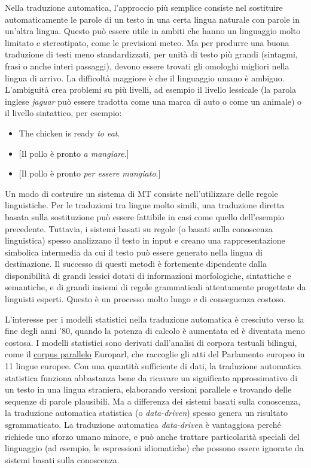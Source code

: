 \documentclass[]{../../metanetpaper}
\begin{document}
\begin{multicols}{2}
Nella traduzione automatica, l'approccio pi\`{u} semplice consiste nel sostituire automaticamente le parole di un testo in una certa lingua naturale con parole in un'altra lingua. Questo pu\`{o} essere utile in ambiti che hanno un linguaggio molto limitato e stereotipato, come le previsioni meteo. Ma per produrre una buona traduzione di testi meno standardizzati, per unit\`{a} di testo pi\`{u} grandi (sintagmi, frasi o anche interi passaggi), devono essere trovati gli omologhi migliori nella lingua di arrivo. La difficolt\`{a} maggiore \`{e} che il linguaggio umano \`{e} ambiguo. L'ambiguit\`{a} crea problemi su pi\`{u} livelli, ad esempio il livello lessicale (la parola inglese \emph{jaguar} pu\`{o} essere tradotta come una marca di auto o come un animale) o il livello sintattico, per esempio:



\begin{itemize}
\item The chicken is ready \emph{to eat}.
\item {[}Il pollo  \`{e} pronto \emph{a mangiare}.{]}
\item {[}Il pollo  \`{e} pronto \emph{per essere mangiato}.{]}
\end{itemize}

Un modo di costruire un sistema di MT consiste nell'utilizzare delle regole linguistiche. Per le traduzioni tra lingue molto simili, una traduzione diretta basata sulla sostituzione pu\`{o} essere fattibile in casi come quello dell'esempio precedente. Tuttavia, i sistemi basati su regole (o basati sulla conoscenza linguistica) spesso analizzano il testo in input e creano una rappresentazione simbolica intermedia da cui il testo pu\`{o} essere generato nella lingua di destinazione. Il successo di questi metodi \`{e} fortemente dipendente dalla disponibilit\`{a} di grandi lessici dotati di informazioni morfologiche, sintattiche e semantiche, e di grandi insiemi di regole grammaticali attentamente progettate da linguisti esperti. Questo \`{e} un processo molto lungo e di conseguenza costoso.

L'interesse per i modelli statistici nella traduzione automatica \`{e} cresciuto verso la fine degli anni '80, quando la potenza di calcolo \`{e} aumentata ed \`{e} diventata meno costosa. I modelli statistici sono derivati dall'analisi di corpora testuali bilingui, come il \underline{corpus parallelo} Europarl, che raccoglie gli atti del Parlamento europeo in 11 lingue europee. Con una quantit\`{a} sufficiente di dati, la traduzione automatica statistica funziona abbastanza bene da ricavare un significato approssimativo di un testo in una lingua straniera, elaborando versioni parallele e trovando delle sequenze di parole plausibili. Ma a differenza dei sistemi basati sulla conoscenza, la traduzione automatica statistica (o \emph{data-driven}) spesso genera un risultato sgrammaticato. La traduzione automatica \emph{data-driven} \`{e} vantaggiosa perch\'{e} richiede uno sforzo umano minore, e pu\`{o} anche trattare particolarit\`{a} speciali del linguaggio (ad esempio, le espressioni idiomatiche) che possono essere ignorate da sistemi basati sulla conoscenza.



\end{multicols}
\end{document}
